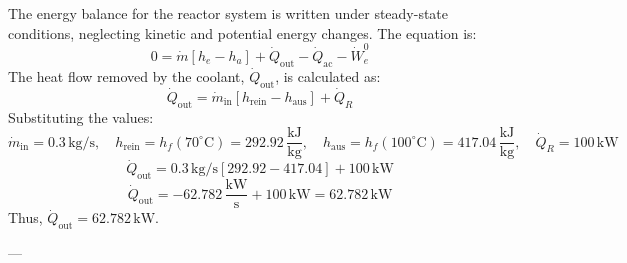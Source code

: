 The energy balance for the reactor system is written under steady-state conditions, neglecting kinetic and potential energy changes. The equation is:  
\[
0 = \dot{m} \left[ h_e - h_a \right] + \dot{Q}_{\text{out}} - \dot{Q}_{\text{ac}} - \dot{W}_e^0
\]  
The heat flow removed by the coolant, \( \dot{Q}_{\text{out}} \), is calculated as:  
\[
\dot{Q}_{\text{out}} = \dot{m}_{\text{in}} \left[ h_{\text{rein}} - h_{\text{aus}} \right] + \dot{Q}_R
\]  
Substituting the values:  
\[
\dot{m}_{\text{in}} = 0.3 \, \text{kg/s}, \quad h_{\text{rein}} = h_f(70^\circ\text{C}) = 292.92 \, \frac{\text{kJ}}{\text{kg}}, \quad h_{\text{aus}} = h_f(100^\circ\text{C}) = 417.04 \, \frac{\text{kJ}}{\text{kg}}, \quad \dot{Q}_R = 100 \, \text{kW}
\]  
\[
\dot{Q}_{\text{out}} = 0.3 \, \text{kg/s} \left[ 292.92 - 417.04 \right] + 100 \, \text{kW}
\]  
\[
\dot{Q}_{\text{out}} = -62.782 \, \frac{\text{kW}}{\text{s}} + 100 \, \text{kW} = 62.782 \, \text{kW}
\]  
Thus, \( \dot{Q}_{\text{out}} = 62.782 \, \text{kW} \).

---